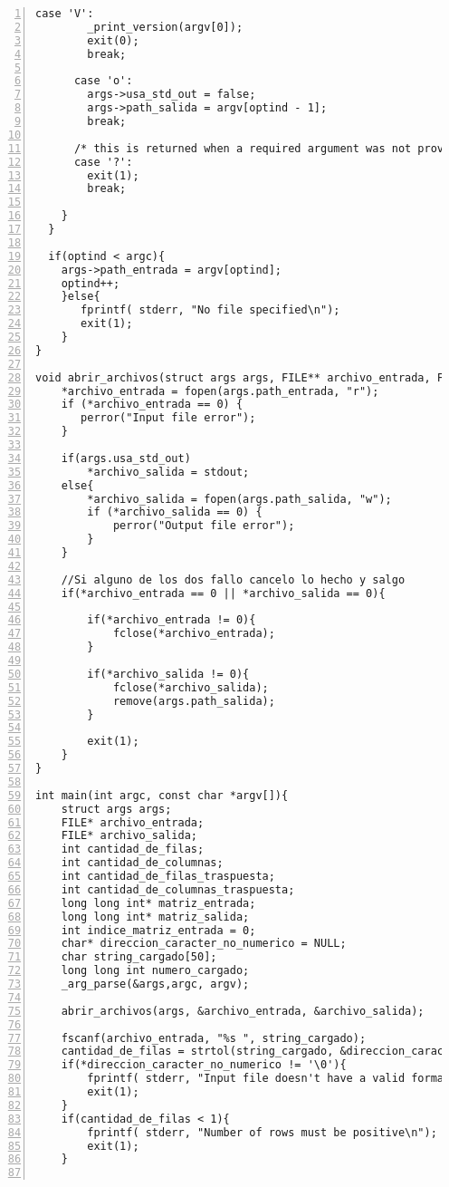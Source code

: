 \documentclass[11pt,a4paper]{article}
\begin{document}
\begin{lstlisting}[numbers=left, tabsize=2, basicstyle=\fontsize{11}{13}\ttfamily, frame=single, caption={makefile}]
      case 'V':
        _print_version(argv[0]);
        exit(0);
        break;
        
      case 'o':
        args->usa_std_out = false;
        args->path_salida = argv[optind - 1];
        break;
        
      /* this is returned when a required argument was not provided */
      case '?':
        exit(1);
        break;
      
    }
  }
  
  if(optind < argc){
    args->path_entrada = argv[optind]; 
    optind++;       
    }else{ 
       fprintf( stderr, "No file specified\n"); 
       exit(1); 
    }
}

void abrir_archivos(struct args args, FILE** archivo_entrada, FILE** archivo_salida){
    *archivo_entrada = fopen(args.path_entrada, "r");
    if (*archivo_entrada == 0) {
       perror("Input file error");
    }
    
    if(args.usa_std_out)
        *archivo_salida = stdout;
    else{
        *archivo_salida = fopen(args.path_salida, "w");
        if (*archivo_salida == 0) {
            perror("Output file error");
        }
    }
    
    //Si alguno de los dos fallo cancelo lo hecho y salgo
    if(*archivo_entrada == 0 || *archivo_salida == 0){
        
        if(*archivo_entrada != 0){
            fclose(*archivo_entrada);
        }
        
        if(*archivo_salida != 0){
            fclose(*archivo_salida);
            remove(args.path_salida);
        }
        
        exit(1);
    }
}

int main(int argc, const char *argv[]){
    struct args args;
    FILE* archivo_entrada;
    FILE* archivo_salida;
    int cantidad_de_filas;
    int cantidad_de_columnas;
    int cantidad_de_filas_traspuesta;
    int cantidad_de_columnas_traspuesta;
    long long int* matriz_entrada;
    long long int* matriz_salida;
    int indice_matriz_entrada = 0;
    char* direccion_caracter_no_numerico = NULL;
    char string_cargado[50];
    long long int numero_cargado;
    _arg_parse(&args,argc, argv);
    
    abrir_archivos(args, &archivo_entrada, &archivo_salida);

    fscanf(archivo_entrada, "%s ", string_cargado);
    cantidad_de_filas = strtol(string_cargado, &direccion_caracter_no_numerico, 0);
    if(*direccion_caracter_no_numerico != '\0'){
        fprintf( stderr, "Input file doesn't have a valid format\n"); 
        exit(1);
    }
    if(cantidad_de_filas < 1){
        fprintf( stderr, "Number of rows must be positive\n"); 
        exit(1);
    }
        

\end{lstlisting}
\end{document}
